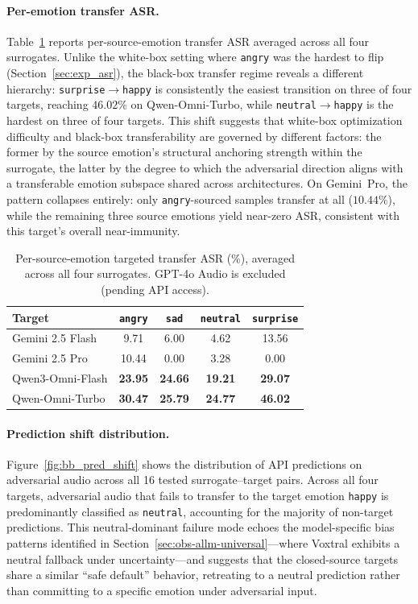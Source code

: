 \paragraph{Per-emotion transfer ASR.}
Table~\ref{tab:bb_per_emotion} reports per-source-emotion transfer ASR averaged across all four surrogates.
Unlike the white-box setting where \texttt{angry} was the hardest to flip (Section~\ref{sec:exp_asr}), the black-box transfer regime reveals a different hierarchy: \texttt{surprise}$\to$\texttt{happy} is consistently the easiest transition on three of four targets, reaching $46.02\%$ on Qwen-Omni-Turbo, while \texttt{neutral}$\to$\texttt{happy} is the hardest on three of four targets.
This shift suggests that white-box optimization difficulty and black-box transferability are governed by different factors: the former by the source emotion's structural anchoring strength within the surrogate, the latter by the degree to which the adversarial direction aligns with a transferable emotion subspace shared across architectures.
On Gemini~Pro, the pattern collapses entirely: only \texttt{angry}-sourced samples transfer at all ($10.44\%$), while the remaining three source emotions yield near-zero ASR, consistent with this target's overall near-immunity.

\begin{table}[t]
\centering
\small
\caption{Per-source-emotion targeted transfer ASR (\%), averaged across all four surrogates. GPT-4o Audio is excluded (pending API access).}
\label{tab:bb_per_emotion}
\setlength{\tabcolsep}{5pt}
\begin{tabular}{l cccc}
\toprule
\textbf{Target} & \texttt{angry} & \texttt{sad} & \texttt{neutral} & \texttt{surprise} \\
\midrule
Gemini 2.5 Flash  &  9.71  &  6.00  &  4.62  & 13.56 \\
Gemini 2.5 Pro    & 10.44  &  0.00  &  3.28  &  0.00 \\
Qwen3-Omni-Flash  & \textbf{23.95} & \textbf{24.66} & \textbf{19.21} & \textbf{29.07} \\
Qwen-Omni-Turbo   & \textbf{30.47} & \textbf{25.79} & \textbf{24.77} & \textbf{46.02} \\
\bottomrule
\end{tabular}
\end{table}

\paragraph{Prediction shift distribution.}
Figure~\ref{fig:bb_pred_shift} shows the distribution of API predictions on adversarial audio across all 16 tested surrogate--target pairs.
Across all four targets, adversarial audio that fails to transfer to the target emotion \texttt{happy} is predominantly classified as \texttt{neutral}, accounting for the majority of non-target predictions.
This neutral-dominant failure mode echoes the model-specific bias patterns identified in Section~\ref{sec:obs-allm-universal}---where Voxtral exhibits a neutral fallback under uncertainty---and suggests that the closed-source targets share a similar ``safe default'' behavior, retreating to a neutral prediction rather than committing to a specific emotion under adversarial input.

